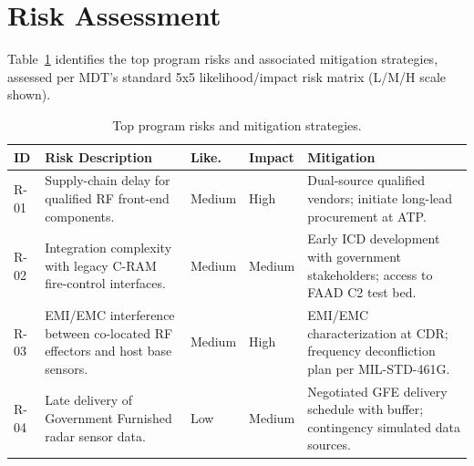 \section{Risk Assessment}

Table~\ref{tab:risk} identifies the top program risks and associated mitigation strategies, assessed per MDT's standard 5x5 likelihood/impact risk matrix (L/M/H scale shown).

\begin{table}[htbp]
\centering
\footnotesize
\begin{tabularx}{\linewidth}{@{}l >{\raggedright\arraybackslash}X l l >{\raggedright\arraybackslash}X@{}}
\toprule
\rowcolor{accentlight}
\textbf{ID} & \textbf{Risk Description} & \textbf{Like.} & \textbf{Impact} & \textbf{Mitigation} \\
\midrule
R-01 & Supply-chain delay for qualified RF front-end components. & Medium & High & Dual-source qualified vendors; initiate long-lead procurement at ATP. \\
R-02 & Integration complexity with legacy C-RAM fire-control interfaces. & Medium & Medium & Early ICD development with government stakeholders; access to FAAD C2 test bed. \\
R-03 & EMI/EMC interference between co-located RF effectors and host base sensors. & Medium & High & EMI/EMC characterization at CDR; frequency deconfliction plan per MIL-STD-461G. \\
R-04 & Late delivery of Government Furnished radar sensor data. & Low & Medium & Negotiated GFE delivery schedule with buffer; contingency simulated data sources. \\
\bottomrule
\end{tabularx}
\caption{Top program risks and mitigation strategies.}
\label{tab:risk}
\end{table}

\clearpage

